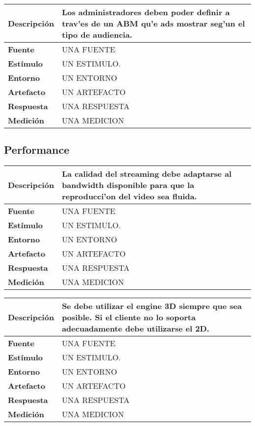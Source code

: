 \begin{center}
  \begin{tabular}{| l | p{10cm} | }
    \hline
    \textbf{Descripción} & Los administradores deben poder definir a trav'es de un ABM qu'e ads mostrar seg'un el tipo de audiencia.\\  \hline
  \textbf{Fuente} & UNA FUENTE\\  \hline
  \textbf{Estímulo} & UN ESTIMULO.\\  \hline
  \textbf{Entorno} & UN ENTORNO\\  \hline
  \textbf{Artefacto} & UN ARTEFACTO\\  \hline
  \textbf{Respuesta} & UNA RESPUESTA\\  \hline
  \textbf{Medición} & UNA MEDICION\\  \hline
  \end{tabular}
\end{center} 



\subsection{Performance}

\begin{center}
  \begin{tabular}{| l | p{10cm} | }
    \hline
  \textbf{Descripción} & La calidad del streaming debe adaptarse al bandwidth disponible para que la reproducci'on del video sea fluida.\\  \hline
  \textbf{Fuente} & UNA FUENTE\\  \hline
  \textbf{Estímulo} & UN ESTIMULO.\\  \hline
  \textbf{Entorno} & UN ENTORNO\\  \hline
  \textbf{Artefacto} & UN ARTEFACTO\\  \hline
  \textbf{Respuesta} & UNA RESPUESTA\\  \hline
  \textbf{Medición} & UNA MEDICION\\  \hline
  \end{tabular}
\end{center} 



\begin{center}
  \begin{tabular}{| l | p{10cm} | }
    \hline
  \textbf{Descripción} & Se debe utilizar el engine 3D siempre que sea posible. Si el cliente no lo soporta adecuadamente debe utilizarse el 2D.\\  \hline
  \textbf{Fuente} & UNA FUENTE\\  \hline
  \textbf{Estímulo} & UN ESTIMULO.\\  \hline
  \textbf{Entorno} & UN ENTORNO\\  \hline
  \textbf{Artefacto} & UN ARTEFACTO\\  \hline
  \textbf{Respuesta} & UNA RESPUESTA\\  \hline
  \textbf{Medición} & UNA MEDICION\\  \hline
  \end{tabular}
\end{center} 



